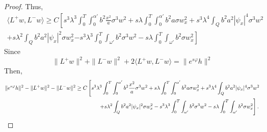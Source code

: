 \documentclass[11pt,oneside,a4papper]{osajnl}
\begin{document}
\begin{proof}
Thus, 	
    \begin{multline*}
		\langle L^+ w,L^- w \rangle \geq C \left[ s^3 \lambda^3 \int_0^T \int_0^{\alpha'} b^2 \frac{x^2}{a} \sigma^3 w^2 +s \lambda \int_0^T \int_0^{\alpha'} b^2 a \sigma w_x^2+s^3 \lambda^4 \int_Q b^2 a^2|\psi_x|^4 \sigma^3 w^2 \right.\\
		+s \lambda^2 \int_Q b^2 a^2 |\psi_x|^2 \sigma w_x^2
		\left. - s^3\lambda^3 \int_0^T\int_{\omega'} b^2 \sigma^3 w^2-s\lambda\int_0^T\int_{\omega'} b^2  \sigma w_x^2\right]
    \end{multline*}
    Since
    $$\|L^+ w\|^2+\|L^- w\|^2+2\langle L^+ w,L^- w \rangle=\|e^{s\varphi} h\|^2$$
	Then,
	\begin{multline*}
		\|e^{s\varphi} h\|^2-\|L^+ w\|^2-\|L^- w\|^2 \geq C \left[ s^3 \lambda^3 \int_0^T \int_0^{\alpha'} b^2 \frac{x^2}{a} \sigma^3 w^2 +s \lambda \int_0^T \int_0^{\alpha'} b^2 a \sigma w_x^2 +s^3 \lambda^4 \int_Q b^2 a^2|\psi_x|^4 \sigma^3 w^2 \right.\\
		\left. \hspace*{6cm} +s \lambda^2 \int_Q b^2 a^2 |\psi_x|^2 \sigma w_x^2 
		- s^3\lambda^3 \int_0^T\int_{\omega'} b^2 \sigma^3 w^2-s\lambda\int_0^T\int_{\omega'} b^2  \sigma w_x^2\right].
	\end{multline*}
    

\end{proof}
\end{document}
